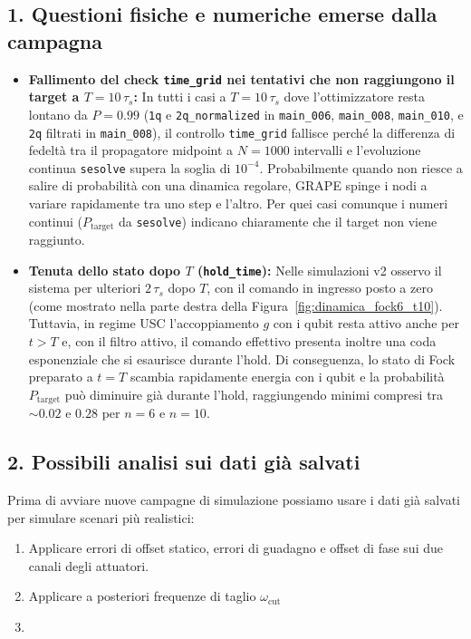 \documentclass[11pt,a4paper]{article}
\begin{document}
\subsection*{1. Questioni fisiche e numeriche emerse dalla campagna}
\begin{itemize}
    \item \textbf{Fallimento del check \texttt{time\_grid} nei tentativi che non raggiungono il target a $T=10\,\tau_s$:}
In tutti i casi a $T=10\,\tau_s$ dove l'ottimizzatore resta lontano da $P=0.99$ (\texttt{1q} e \texttt{2q\_normalized} in \texttt{main\_006}, \texttt{main\_008}, \texttt{main\_010}, e \texttt{2q} filtrati in \texttt{main\_008}), il controllo \texttt{time\_grid} fallisce perché la differenza di fedeltà tra il propagatore midpoint a $N=1000$ intervalli e l'evoluzione continua \texttt{sesolve} supera la soglia di $10^{-4}$. Probabilmente quando non riesce a salire di probabilità con una dinamica regolare, GRAPE spinge i nodi a variare rapidamente tra uno step e l'altro. Per quei casi comunque i numeri continui ($P_{\text{target}}$ da \texttt{sesolve}) indicano chiaramente che il target non viene raggiunto.
\item \textbf{Tenuta dello stato dopo $T$ (\texttt{hold\_time}):}
Nelle simulazioni v2 osservo il sistema per ulteriori $2\,\tau_s$ dopo $T$, con il comando in ingresso posto a zero (come mostrato nella parte destra della Figura~\ref{fig:dinamica_fock6_t10}). Tuttavia, in regime USC l'accoppiamento $g$ con i qubit resta attivo anche per $t>T$ e, con il filtro attivo, il comando effettivo presenta inoltre una coda esponenziale che si esaurisce durante l'hold. Di conseguenza, lo stato di Fock preparato a $t=T$ scambia rapidamente energia con i qubit e la probabilità $P_{\text{target}}$ può diminuire già durante l'hold, raggiungendo minimi compresi tra $\sim 0.02$ e $0.28$ per $n=6$ e $n=10$.
\end{itemize}

\subsection*{2. Possibili analisi sui dati già salvati}
Prima di avviare nuove campagne di simulazione possiamo usare i dati già salvati per simulare scenari più realistici:
\begin{enumerate}
    \item Applicare errori di offset statico, errori di guadagno e offset di fase sui due canali degli attuatori.
    \item Applicare a posteriori frequenze di taglio $\omega_{\text{cut}}$
    \item {}
\end{enumerate}
\end{document}

